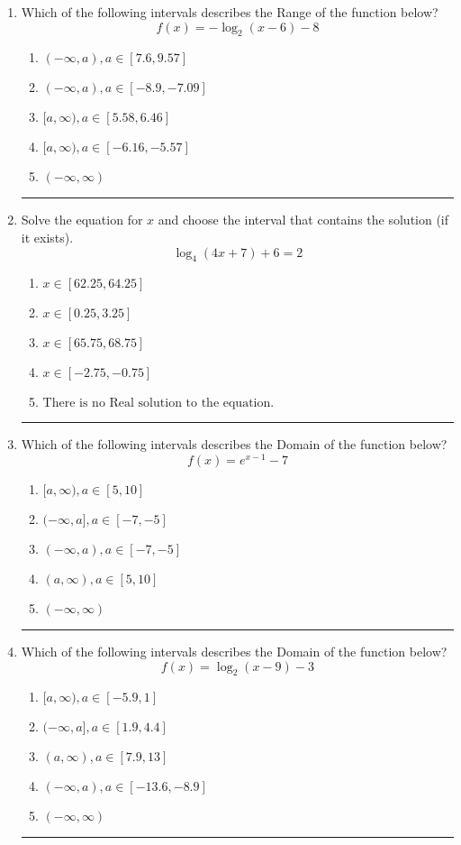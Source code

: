\documentclass[14pt]{extbook}
\newcommand{\litem}[1]{\item#1\hspace*{-1cm}\rule{\textwidth}{0.4pt}}
\begin{document}
\begin{enumerate}
\litem{
Which of the following intervals describes the Range of the function below?\[ f(x) = -\log_2{(x-6)}-8 \]\begin{enumerate}[label=\Alph*.]
\item \( (-\infty, a), a \in [7.6, 9.57] \)
\item \( (-\infty, a), a \in [-8.9, -7.09] \)
\item \( [a, \infty), a \in [5.58, 6.46] \)
\item \( [a, \infty), a \in [-6.16, -5.57] \)
\item \( (-\infty, \infty) \)

\end{enumerate} }
\litem{
Solve the equation for $x$ and choose the interval that contains the solution (if it exists).\[ \log_{4}{(4x+7)}+6 = 2 \]\begin{enumerate}[label=\Alph*.]
\item \( x \in [62.25, 64.25] \)
\item \( x \in [0.25, 3.25] \)
\item \( x \in [65.75, 68.75] \)
\item \( x \in [-2.75, -0.75] \)
\item \( \text{There is no Real solution to the equation.} \)

\end{enumerate} }
\litem{
Which of the following intervals describes the Domain of the function below?\[ f(x) = e^{x-1}-7 \]\begin{enumerate}[label=\Alph*.]
\item \( [a, \infty), a \in [5, 10] \)
\item \( (-\infty, a], a \in [-7, -5] \)
\item \( (-\infty, a), a \in [-7, -5] \)
\item \( (a, \infty), a \in [5, 10] \)
\item \( (-\infty, \infty) \)

\end{enumerate} }
\litem{
Which of the following intervals describes the Domain of the function below?\[ f(x) = \log_2{(x-9)}-3 \]\begin{enumerate}[label=\Alph*.]
\item \( [a, \infty), a \in [-5.9, 1] \)
\item \( (-\infty, a], a \in [1.9, 4.4] \)
\item \( (a, \infty), a \in [7.9, 13] \)
\item \( (-\infty, a), a \in [-13.6, -8.9] \)
\item \( (-\infty, \infty) \)


\end{enumerate}}
\end{enumerate}
\end{document}
